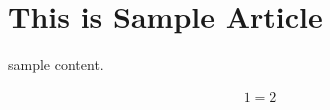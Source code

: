 \documentclass{article}
\begin{document}
\section{This is Sample Article}

sample content.

\begin{align*}
  1 = 2
\end{align*}
\end{document}
